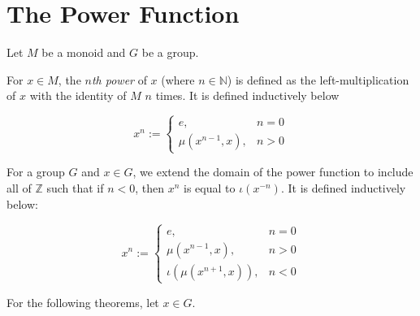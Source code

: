 \section{The Power Function}

Let $M$ be a monoid and $G$ be a group.

\begin{definition}
    \label{definition : mpow}
    \leanok
    For $x \in M$, the \textit{$n$th power} of $x$ (where $n \in \mathbb{N}$) is defined as the left-multiplication of $x$ with the identity of $M$ $n$ times. It is defined inductively below

    \begin{equation*}
        x^n := \begin{cases}
            e, & n = 0 \\
            \mu(x^{n-1}, x), & n > 0
        \end{cases}
    \end{equation*}
\end{definition}

\begin{definition}
    \label{definition : gpow}
    \leanok
    For a group $G$ and $x \in G$, we extend the domain of the power function to include all of $\mathbb{Z}$ such that if $n < 0$, then $x^n$ is equal to $\iota(x^{-n})$. It is defined inductively below:

    \begin{equation*}
        x^n := \begin{cases}
            e, & n = 0 \\
            \mu(x^{n-1}, x), & n > 0 \\
            \iota(\mu(x^{n+1}, x)), & n < 0
        \end{cases}
    \end{equation*}
\end{definition}

For the following theorems, let $x \in G$.
